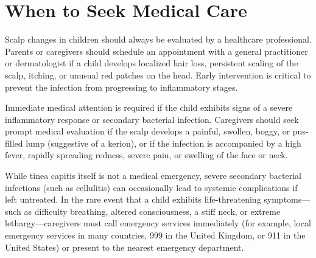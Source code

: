 \section*{When to Seek Medical Care}
Scalp changes in children should always be evaluated by a healthcare professional. Parents or caregivers should schedule an appointment with a general practitioner or dermatologist if a child develops localized hair loss, persistent scaling of the scalp, itching, or unusual red patches on the head. Early intervention is critical to prevent the infection from progressing to inflammatory stages.

Immediate medical attention is required if the child exhibits signs of a severe inflammatory response or secondary bacterial infection. Caregivers should seek prompt medical evaluation if the scalp develops a painful, swollen, boggy, or pus-filled lump (suggestive of a kerion), or if the infection is accompanied by a high fever, rapidly spreading redness, severe pain, or swelling of the face or neck.

While tinea capitis itself is not a medical emergency, severe secondary bacterial infections (such as cellulitis) can occasionally lead to systemic complications if left untreated. In the rare event that a child exhibits life-threatening symptoms---such as difficulty breathing, altered consciousness, a stiff neck, or extreme lethargy---caregivers must call emergency services immediately (for example, local emergency services in many countries, 999 in the United Kingdom, or 911 in the United States) or present to the nearest emergency department.

